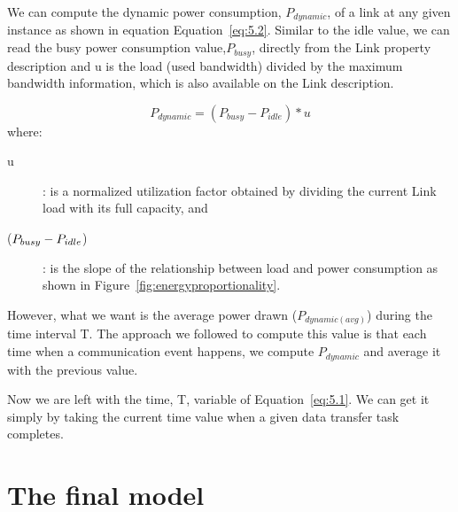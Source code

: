 We can compute the dynamic power consumption, \(P_{dynamic}\), of a link at any given instance as shown in equation Equation~\ref{eq:5.2}. Similar to the idle value, we can read the busy power consumption value,\(P_{busy}\), directly from the 
Link property description and u is the load (used bandwidth) divided by the maximum bandwidth information, which is also available on the Link description. 

\begin{equation} \label{eq:5.2}
P_{dynamic} = (P_{busy} - P_{idle}) * u 
\end{equation} 
where:
\begin{description}
    \item [u]: is a normalized utilization factor obtained by dividing the current Link load with its full capacity, and 
    \item [(\($$P_{busy} - P_{idle}$$\))]: is the slope of the relationship between load and power consumption as shown in Figure~\ref{fig:energyproportionality}.
\end{description} 

However, what we want is the average power drawn (\(P_{dynamic (avg)}\))  during the time interval T.  The approach we followed to compute this value is that each time when a communication event happens, we compute \(P_{dynamic}\) and average it with the previous value. 

Now we are left with the time, T, variable of Equation~\ref{eq:5.1}. We can get it simply by taking the current time value when a given data transfer task completes. 


 
\section{The final model}

